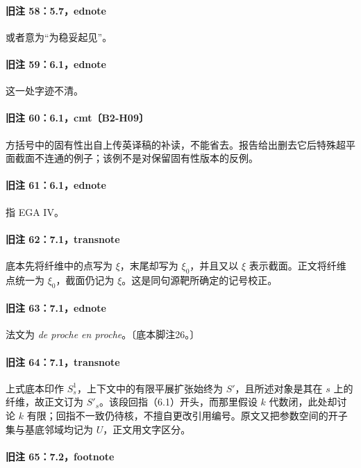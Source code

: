 \paragraph{旧注 58：5.7，ednote}

或者意为“为稳妥起见”。

\paragraph{旧注 59：6.1，ednote}

这一处字迹不清。

\paragraph{旧注 60：6.1，cmt〔B2-H09〕}

方括号中的固有性出自上传英译稿的补读，不能省去。报告给出删去它后特殊超平面截面不连通的例子；该例不是对保留固有性版本的反例。

\paragraph{旧注 61：6.1，ednote}

指 EGA IV。

\paragraph{旧注 62：7.1，transnote}

底本先将纤维中的点写为 $\xi$，末尾却写为 $\xi_0$，并且又以 $\xi$ 表示截面。正文将纤维点统一为 $\xi_0$，截面仍记为 $\xi$。这是同句源靶所确定的记号校正。

\paragraph{旧注 63：7.1，ednote}

法文为 \textit{de proche en proche}。〔底本脚注26。〕

\paragraph{旧注 64：7.1，transnote}

上式底本印作 $S_s^1$，上下文中的有限平展扩张始终为 $S'$，且所述对象是其在 $s$ 上的纤维，故正文订为 $S'_s$。该段回指（6.1）开头，而那里假设 $k$ 代数闭，此处却讨论 $k$ 有限；回指不一致仍待核，不擅自更改引用编号。原文又把参数空间的开子集与基底邻域均记为 $U$，正文用文字区分。

\paragraph{旧注 65：7.2，footnote}

